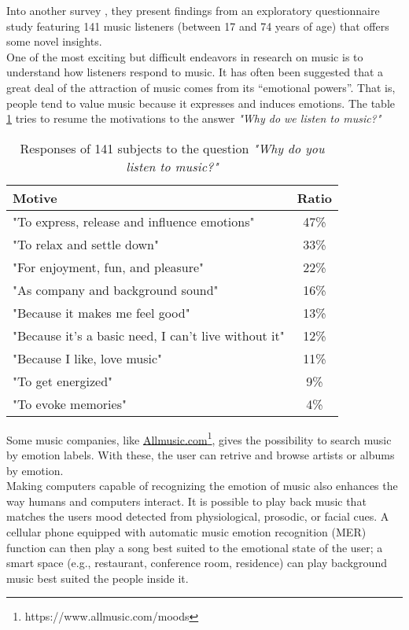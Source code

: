 Into another survey \cite{juslin2004expression}, they present findings from an exploratory questionnaire study featuring 141 music listeners (between 17 and 74 years of age) that offers some novel insights.
\\ 
One of the most exciting but difficult endeavors in research on music is to understand how listeners respond to music. It has often been suggested that a great deal of the attraction of music comes from its “emotional powers”. That is, people tend to value music because it expresses and induces emotions.
The table  \ref{table:motivation_music} tries to resume the motivations to the answer \textit{"Why do we listen to music?"}
\begin{table}[h!]
\centering
\begin{tabular}{|l | c|}
\hline
Motive & Ratio\\ [0.5ex] 
\hline\hline "To express, release and influence emotions"	&	47\%	\\ 
\hline "To relax and settle down"										&	33\%	\\
\hline "For enjoyment, fun, and pleasure"							&	22\%	\\
\hline "As company and background sound"						&	16\%	\\
\hline "Because it makes me feel good"								&	13\%	\\
\hline "Because it's a basic need, I can't live without it"		&	12\%	\\
\hline "Because I like, love music"										&	11\%	\\
\hline "To get energized"													&	9\%	\\
\hline "To evoke memories"												&	4\%	\\ 
\hline
\end{tabular}
\caption{Responses of 141 subjects to the question \textit{"Why do you listen to music?"}}
\label{table:motivation_music}
\end{table}

\indent
Some music companies, like  \href{https://www.allmusic.com/moods}{Allmusic.com}\footnote{https://www.allmusic.com/moods}, gives the possibility to search music by emotion labels. With these, the user can retrive and browse artists or albums by emotion.
\\ \indent
Making computers capable of recognizing the emotion of music also enhances the way humans and computers interact. It is possible to play back music that matches the users mood detected from physiological, prosodic, or facial cues. A cellular phone equipped with automatic music emotion recognition (MER) function can then play a song best suited to the emotional state of the user; a smart space (e.g., restaurant, conference room, residence) can play background music best suited the people inside it.

